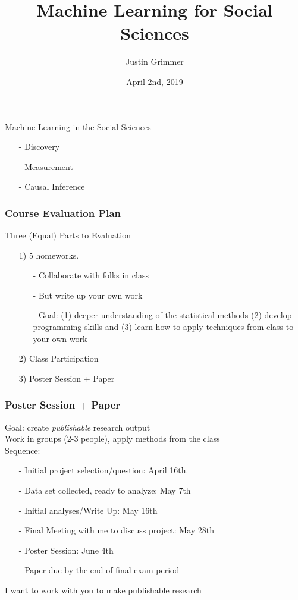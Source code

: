 \documentclass{beamer}
\title[Machine Learning] %
{Machine Learning for Social Sciences}
\author{Justin Grimmer}
\institute[Stanford University]{Professor\\Department of Political Science \\  University of Chicago}
\date{April 2nd, 2019}
\numberwithin{equation}{section}
\begin{document}
\begin{frame}
\titlepage
\end{frame}





\begin{frame}

\huge 

Machine Learning in the Social Sciences 

\begin{itemize}
\item[-] Discovery 
\item[-] Measurement
\item[-] Causal Inference
\end{itemize}  

\end{frame}


\begin{frame}
\frametitle{Course Evaluation Plan}

Three (Equal) Parts to Evaluation 

\begin{itemize}
  \item[1)] 5 homeworks. 
  \begin{itemize}
    \item[-] Collaborate with folks in class
    \item[-] But write up your own work
    \item[-] Goal: (1) deeper understanding of the statistical methods (2) develop programming skills and (3) learn how to apply techniques from class to your own work
  \end{itemize}
  \item[2)] Class Participation 
  \item[3)] Poster Session + Paper
\end{itemize}  


\end{frame}


\begin{frame}
\frametitle{Poster Session + Paper}

Goal: create \emph{publishable} research output\\
Work in groups (2-3 people), apply methods from the class \\
Sequence:
\begin{itemize}
\item[-] Initial project selection/question: April 16th.  
\item[-] Data set collected, ready to analyze: May 7th
\item[-] Initial analyses/Write Up: May 16th
\item[-] Final Meeting with me to discuss project:  May 28th
\item[-] \alert{Poster Session}: June 4th
\item[-] Paper due by the end of final exam period
\end{itemize} 


\alert{I want to work with you to make publishable research}



\end{frame}
\end{document}
